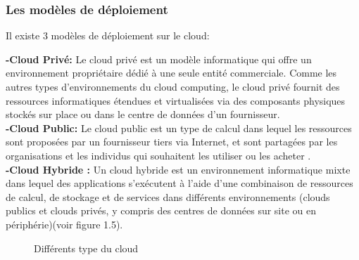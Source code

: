\subsubsection{\selectfont\Large Les modèles de déploiement }

Il existe 3 modèles de déploiement sur le cloud:

\par \noindent \textbf{\Large -Cloud Privé:  } Le cloud privé est un modèle informatique qui offre un environnement propriétaire dédié à une seule entité commerciale. Comme les autres types d'environnements du cloud computing, le cloud privé fournit des ressources informatiques étendues et virtualisées via des composants physiques stockés sur place ou dans le centre de données d'un fournisseur\cite{6}.\\[0.1cm]

\noindent \textbf{\Large -Cloud Public: } Le cloud public est un type de calcul dans lequel les ressources sont proposées par un fournisseur tiers via Internet, et sont partagées par les organisations et les individus qui souhaitent les utiliser ou les acheter \cite{7}.\\[0.1cm]

\noindent \textbf{\Large -Cloud Hybride :  } Un cloud hybride est un environnement informatique mixte dans lequel des applications s'exécutent à l'aide d'une combinaison de ressources de calcul, de stockage et de services dans différents environnements (clouds publics et clouds privés, y compris des centres de données sur site ou en périphérie)\cite{8}(voir figure 1.5).\\[0.1cm]

\begin{figure}[H]
    \begin{center}
    \end{center}

    \caption{ Différents type du cloud}
\end{figure}

